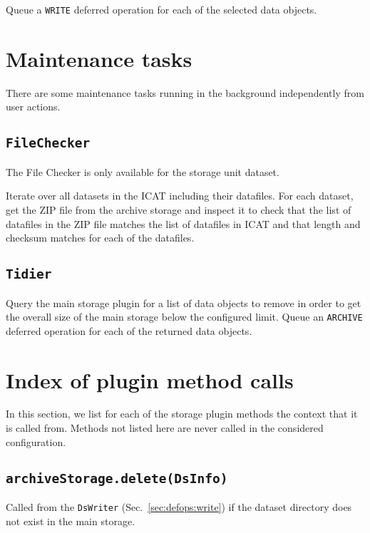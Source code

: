 \documentclass[paper=a4]{scrartcl}
\begin{document}
Queue a \texttt{WRITE} deferred operation for each of the selected
data objects.


\section{Maintenance tasks}
\label{sec:maintenance}

There are some maintenance tasks running in the background
independently from user actions.

\subsection{\texttt{FileChecker}}
\label{sec:maintenance:filechecker}

The File Checker is only available for the storage unit dataset.

Iterate over all datasets in the ICAT including their datafiles.  For
each dataset, get the ZIP file from the archive storage and inspect it
to check that the list of datafiles in the ZIP file matches the list
of datafiles in ICAT and that length and checksum matches for each of
the datafiles.

\subsection{\texttt{Tidier}}
\label{sec:maintenance:tidier}

Query the main storage plugin for a list of data objects to remove in
order to get the overall size of the main storage below the configured
limit.  Queue an \texttt{ARCHIVE} deferred operation for each of the
returned data objects.


\section{Index of plugin method calls}
\label{sec:plugincalls}

In this section, we list for each of the storage plugin methods the
context that it is called from.  Methods not listed here are never
called in the considered configuration.

\subsection{\texttt{archiveStorage.delete(DsInfo)}}

Called from the \texttt{DsWriter} (Sec.\ \ref{sec:defops:write}) if
the dataset directory does not exist in the main storage.
\end{document}
